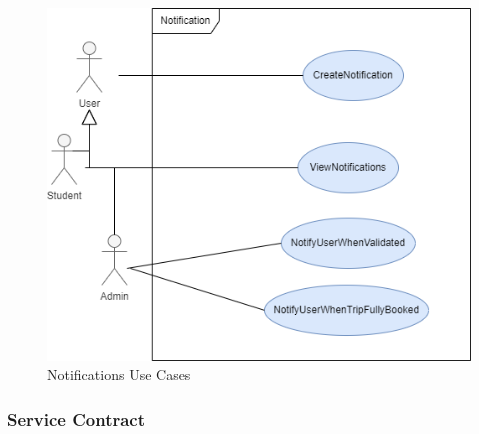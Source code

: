 \documentclass[hidelinks, 12pt, a4paper]{article}
\begin{document}
                    \begin{figure}[H]
                    
                        \centering
                        \includegraphics[]{images/Notification Usecase.drawio.png}
                        \caption{Notifications Use Cases}
                        \label{fig:User UseCases}
                        
                    \end{figure}
   \newpage                 
                \subsubsection{Service Contract}
            
\end{document}
